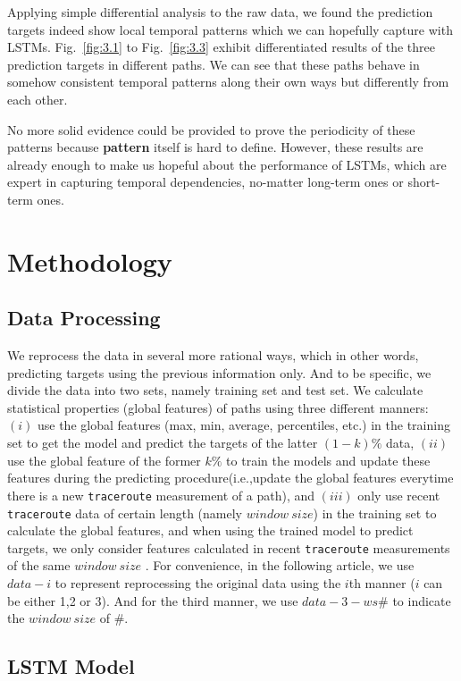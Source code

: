 \documentclass[sigconf]{acmart}
\begin{document}
	Applying simple differential analysis to the raw data, we found the prediction targets indeed show local temporal patterns which we can hopefully capture with LSTMs. Fig.~\ref{fig:3.1} to Fig.~\ref{fig:3.3} exhibit differentiated results of the three prediction targets in different paths. We can see that these paths behave in somehow consistent temporal patterns along their own ways but differently from each other.
	
	No more solid evidence could be provided to prove the periodicity of these patterns because \textbf{pattern} itself is hard to define. However, these results are already enough to make us hopeful about the performance of LSTMs, which are expert in capturing temporal dependencies, no-matter long-term ones or short-term ones.

	\section{Methodology}
	\subsection{Data Processing}
	We reprocess the data in several more rational ways, which in other words, predicting targets using the previous information only. And to be specific, we divide the data into two sets, namely training set and test set. We calculate statistical properties (global features) of paths using three different manners: $(i)$ use the global features (max, min, average, percentiles, etc.) in the training set to get the model and predict the targets of the latter $(1-k)\%$ data, $(ii)$ use the global feature of the former $k\%$ to train the models and update these features during the predicting procedure(i.e.,update the global features everytime there is a new \texttt{traceroute} measurement of a path), and $(iii)$ only use recent \texttt{traceroute} data of certain length (namely $window\ size$) in the training set to calculate the global features, and when using the trained model to predict targets, we only consider features calculated in  recent \texttt{traceroute} measurements of the same $window\ size$ . For convenience, in the following article, we use $data-i$ to represent reprocessing the original data using the $i$th manner ($i$ can be either 1,2 or 3). And for the third manner, we use $data-3-ws\#$ to indicate the $window\ size$ of $\#$.
	
	\subsection{LSTM Model}
	
\end{document}
